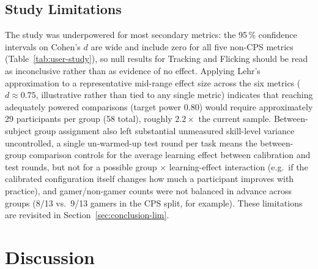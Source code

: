 

\subsection{Study Limitations}
The study was underpowered for most secondary metrics: the 95\,\% confidence
intervals on Cohen's $d$ are wide and include zero for all five non-CPS
metrics (Table~\ref{tab:user-study}), so null results for Tracking and
Flicking should be read as inconclusive rather than as evidence of no effect.
Applying Lehr's approximation to a representative mid-range effect size
across the six metrics ($d\approx0.75$, illustrative rather than tied to
any single metric) indicates that reaching adequately powered comparisons
(target power 0.80) would require approximately 29 participants per group
(58 total), roughly $2.2\times$ the current sample. Between-subject group assignment also left
substantial unmeasured skill-level variance uncontrolled, a single
un-warmed-up test round per task means the between-group comparison controls
for the average learning effect between calibration and test rounds, but not
for a possible group $\times$ learning-effect interaction (e.g.\ if the
calibrated configuration itself changes how much a participant improves with
practice), and gamer/non-gamer counts were not balanced in advance across
groups (8/13 vs.\ 9/13 gamers in the CPS split, for example). These
limitations are revisited in Section~\ref{sec:conclusion-lim}.

\section{Discussion}
\label{sec:eval-discussion}

